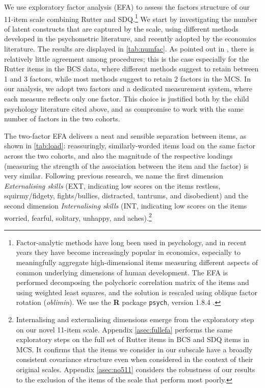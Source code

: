 We use exploratory factor analysis (EFA) to assess the factors structure of our 11-item scale combining Rutter and SDQ.\footnote{Factor-analytic methods have long been used in psychology, and in recent years they have become increasingly popular in economics, especially to meaningfully aggregate high-dimensional items measuring different aspects of common underlying dimensions of human development. The EFA is performed decomposing the polychoric correlation matrix of the items and using weighted least squares, and the solution is rescaled using oblique factor rotation (\emph{oblimin}). We use the \textbf{\textsf{R}} package \texttt{psych}, version 1.8.4 \citep{Revelle2018}.} We start by investigating the number of latent constructs that are captured by the scale, using different methods developed in the psychometric literature, and recently adopted by the economics literature. The results are displayed in \autoref{tab:numfac}. As pointed out in \citet{Conti2014}, there is relatively little agreement among procedures; this is the case especially for the Rutter items in the BCS data, where different methods suggest to retain between 1 and 3 factors, while most methods suggest to retain 2 factors in the MCS. In our analysis, we adopt two factors and a dedicated measurement system, where each measure reflects only one factor. This choice is justified both by the child psychology literature cited above, and as compromise to work with the same number of factors in the two cohorts. 

The two-factor EFA delivers a neat and sensible separation between items, as shown in \autoref{tab:load}: reassuringly, similarly-worded items load on the same factor across the two cohorts, and also the magnitude of the respective loadings (measuring the strength of the association between the item and the factor) is very similar. Following previous research, we name the first dimension \emph{Externalising skills} (EXT, indicating low scores on the items restless, squirmy/fidgety, fights/bullies, distracted, tantrums, and disobedient) and the second dimension \emph{Internalising skills} (INT, indicating low scores on the items worried, fearful, solitary, unhappy, and aches).\footnote{Internalising and externalising dimensions emerge from the exploratory step on our novel 11-item scale. Appendix \autoref{asec:fullefa} performs the same exploratory steps on the full set of Rutter items in BCS and SDQ items in MCS. It confirms that the items we consider in our subscale have a broadly consistent covariance structure even when considered in the context of their original scales. Appendix \autoref{asec:no511} considers the robustness of our results to the exclusion of the items of the scale that perform most poorly.}


